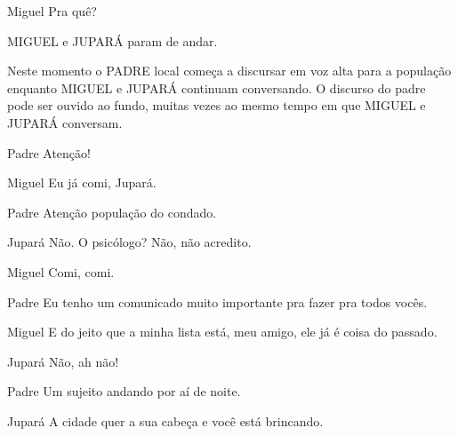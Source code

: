 \documentclass{screenplay}
\begin{document}
\begin{dialogue}{Miguel}
    Pra quê?
\end{dialogue}

MIGUEL e JUPARÁ param de andar.

Neste momento o PADRE local começa a discursar em voz alta para a população enquanto MIGUEL e JUPARÁ continuam conversando. O discurso do padre pode ser ouvido ao fundo, muitas vezes ao mesmo tempo em que MIGUEL e JUPARÁ conversam.

\begin{dialogue}{Padre}
    Atenção!
\end{dialogue}

\begin{dialogue}[continuando]{Miguel}
    Eu já comi, Jupará.
\end{dialogue}

\begin{dialogue}{Padre}
    Atenção população do condado.
\end{dialogue}

\begin{dialogue}{Jupará}
    Não. O psicólogo? Não, não acredito.
\end{dialogue}

\begin{dialogue}{Miguel}
    Comi, comi.
\end{dialogue}

\begin{dialogue}{Padre}
    Eu tenho um comunicado muito importante pra fazer pra todos vocês.
\end{dialogue}

\begin{dialogue}{Miguel}
    E do jeito que a minha lista está, meu amigo, ele já é coisa do passado.
\end{dialogue}

\begin{dialogue}{Jupará}
    Não, ah não!
\end{dialogue}

\begin{dialogue}{Padre}
    Um sujeito  andando por aí de noite.
\end{dialogue}

\begin{dialogue}{Jupará}
    A cidade quer a sua cabeça e você está brincando.
\end{dialogue}
\end{document}
